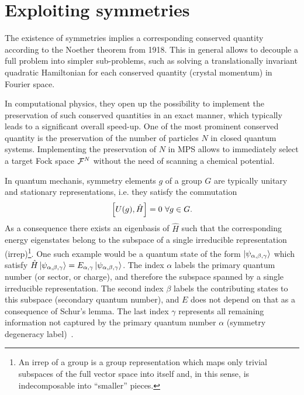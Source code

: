 \section{Exploiting symmetries}
\label{sec:exploiting_symmetries}
%
%
The existence of symmetries implies a corresponding conserved quantity according to the Noether theorem from 1918.
This in general allows to decouple a full problem into simpler sub-problems, such as solving a translationally invariant quadratic Hamiltonian for each conserved quantity (crystal momentum) in Fourier space.

In computational physics, they open up the possibility to implement the preservation of such conserved quantities in an exact manner, which typically leads to a significant overall speed-up.
One of the most prominent conserved quantity is the preservation of the number of particles $N$ in closed quantum systems.
Implementing the preservation of $N$ in MPS allows to immediately select a target Fock space $\mathcal{F}^N$ without the need of scanning a chemical potential.

In quantum mechanis, symmetry elements $g$ of a group $G$ are typically unitary and stationary representations, i.e. they satisfy the commutation
\begin{align}
    \left[ U(g),\hat H \right] = 0\ \forall g\in G.
\end{align}
As a consequence there exists an eigenbasis of $\hat H$ such that the corresponding energy eigenstates belong to the subspace of a single irreducible representation (irrep)\footnote{An irrep of a group is a group representation which maps only trivial subspaces of the full vector space into itself and, in this sense, is indecomposable into ``smaller'' pieces.}.
One such example would be a quantum state of the form $\ket{\psi_{\alpha,\beta,\gamma}}$ which satisfy $\hat H\ket{\psi_{\alpha,\beta,\gamma}} = E_{\alpha,\gamma}\ket{\psi_{\alpha,\beta,\gamma}}$.
The index $\alpha$ labels the primary quantum number (or sector, or charge), and therefore the subspace spanned by a single irreducible representation.
The second index $\beta$ labels the contributing states to this subspace (secondary quantum number), and $E$ does not depend on that as a consequence of Schur's lemma.
The last index $\gamma$ represents all remaining information not captured by the primary quantum number $\alpha$ (symmetry degeneracy label)~\cite{Silvi2019}.

